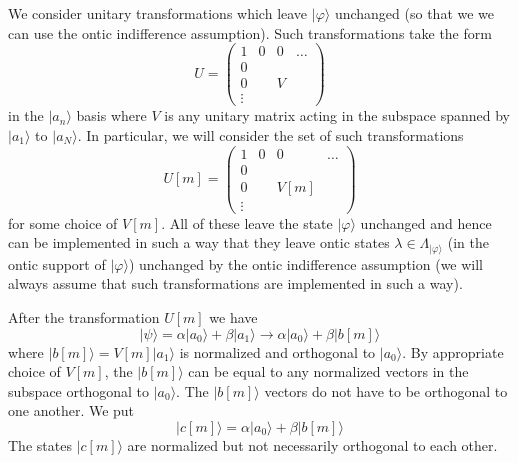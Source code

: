 \documentclass[12pt]{article}
\begin{document}
We consider unitary transformations which leave $|\varphi\rangle$ unchanged (so that we we can use the ontic indifference assumption).  Such transformations take the form \begin{equation} U=
\left( \begin{array}{c|ccc} 1 & 0  & 0 & \hdots  \\ \hline 0 & {} & {}& {}   \\ 0 & {} & V & {}  \\ \vdots &{}&{}&{} \end{array} \right) \end{equation} in the $|a_n\rangle$ basis where $V$
is any unitary matrix acting in the subspace spanned by $|a_1\rangle$ to $|a_N\rangle$.  In particular, we will consider the set of such transformations \begin{equation}\label{Umform} U[m]=
\left( \begin{array}{c|ccc} 1 & 0  & 0 & \hdots  \\ \hline 0 & {} & {}& {}   \\ 0 & {} & V[m] & {}  \\ \vdots &{}&{}&{} \end{array} \right) \end{equation} for some choice of $V[m]$. All of
these leave the state $|\varphi\rangle$ unchanged and hence can be implemented in such a way that they leave ontic states $\lambda\in\Lambda_{|\varphi\rangle}$ (in the ontic support of
$|\varphi\rangle$) unchanged by the ontic indifference assumption (we will always assume that such transformations are implemented in such a way).

After the transformation $U[m]$ we have \begin{equation} |\psi\rangle = \alpha |a_0\rangle + \beta |a_1\rangle \longrightarrow \alpha |a_0\rangle + \beta |b[m]\rangle \end{equation} where
$|b[m]\rangle = V[m] |a_1\rangle$ is normalized and orthogonal to $|a_0\rangle$.  By appropriate choice of $V[m]$, the $|b[m]\rangle$ can be equal to any normalized vectors in the subspace
orthogonal to $|a_0\rangle$. The $|b[m]\rangle$ vectors do not have to be orthogonal to one another.  We put \begin{equation} |c[m]\rangle =  \alpha |a_0\rangle + \beta |b[m]\rangle
\end{equation} The states $|c[m]\rangle$ are normalized but not necessarily orthogonal to each other.
\end{document}
